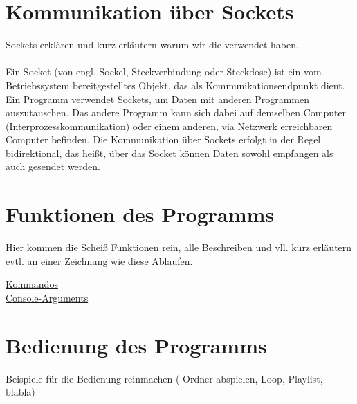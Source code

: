 \section{Kommunikation über Sockets}
Sockets erklären und kurz erläutern warum wir die verwendet haben.\\
\\
Ein Socket (von engl. Sockel, Steckverbindung oder Steckdose) ist ein vom Betriebssystem bereitgestelltes Objekt, das als Kommunikationsendpunkt dient. Ein Programm verwendet Sockets, um Daten mit anderen Programmen auszutauschen. Das andere Programm kann sich dabei auf demselben Computer (Interprozesskommunikation) oder einem anderen, via Netzwerk erreichbaren Computer befinden. Die Kommunikation über Sockets erfolgt in der Regel bidirektional, das heißt, über das Socket können Daten sowohl empfangen als auch gesendet werden.

\section{Funktionen des Programms}
Hier kommen die Scheiß Funktionen rein, alle Beschreiben und vll. kurz erläutern evtl. an einer Zeichnung wie diese Ablaufen.

\href{https://github.com/alexanderklapdor/RaspberryPi_Go_Audioplayer#commands-of-the-client}{Kommandos}
\\
\href{https://github.com/alexanderklapdor/RaspberryPi_Go_Audioplayer#console-arguments}{Console-Arguments}


\section{Bedienung des Programms}
Beispiele für die Bedienung reinmachen ( Ordner abspielen, Loop, Playlist, blabla)

